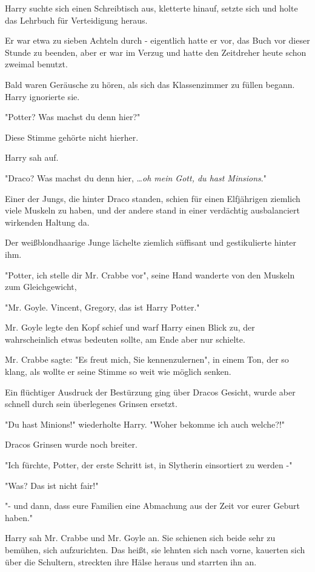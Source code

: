 {Harry suchte sich einen Schreibtisch aus, kletterte hinauf, setzte sich und holte das Lehrbuch für Verteidigung heraus.

Er war etwa zu sieben Achteln durch - eigentlich hatte er vor, das Buch vor dieser Stunde zu beenden, aber er war im Verzug und hatte den Zeitdreher heute schon zweimal benutzt.

Bald waren Geräusche zu hören, als sich das Klassenzimmer zu füllen begann. Harry ignorierte sie.

"Potter? Was machst du denn hier?"

Diese Stimme gehörte nicht hierher.

Harry sah auf.

"Draco? Was machst du denn hier, …\emph{oh mein Gott, du hast Minsions}."

Einer der Jungs, die hinter Draco standen, schien für einen Elfjährigen ziemlich viele Muskeln zu haben, und der andere stand in einer verdächtig ausbalanciert wirkenden Haltung da.

Der weißblondhaarige Junge lächelte ziemlich süffisant und gestikulierte hinter ihm.

"Potter, ich stelle dir Mr. Crabbe vor", seine Hand wanderte von den Muskeln zum Gleichgewicht,

"Mr. Goyle. Vincent, Gregory, das ist Harry Potter."

Mr. Goyle legte den Kopf schief und warf Harry einen Blick zu, der wahrscheinlich etwas bedeuten sollte, am Ende aber nur schielte.

Mr. Crabbe sagte: "Es freut mich, Sie kennenzulernen", in einem Ton, der so klang, als wollte er seine Stimme so weit wie möglich senken.

Ein flüchtiger Ausdruck der Bestürzung ging über Dracos Gesicht, wurde aber schnell durch sein überlegenes Grinsen ersetzt.

"Du hast Minions!" wiederholte Harry. "Woher bekomme ich auch welche?!"

Dracos Grinsen wurde noch breiter.

"Ich fürchte, Potter, der erste Schritt ist, in Slytherin einsortiert zu werden -"

"Was? Das ist nicht fair!"

"- und dann, dass eure Familien eine Abmachung aus der Zeit vor eurer Geburt haben."

Harry sah Mr. Crabbe und Mr. Goyle an. Sie schienen sich beide sehr zu bemühen, sich aufzurichten. Das heißt, sie lehnten sich nach vorne, kauerten sich über die Schultern, streckten ihre Hälse heraus und starrten ihn an.

}

